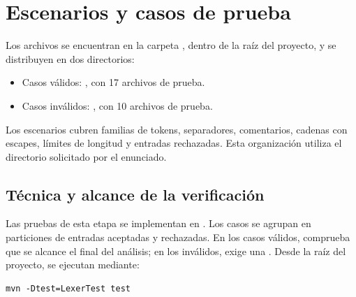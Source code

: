 \section{Escenarios y casos de prueba}
Los archivos se encuentran en la carpeta , dentro de
la raíz del proyecto, y se distribuyen en dos directorios:
\begin{itemize}[leftmargin=*]
  \item Casos válidos: , con 17 archivos de prueba.
  \item Casos inválidos: , con 10 archivos de prueba.
\end{itemize}
Los escenarios cubren familias de tokens, separadores, comentarios,
cadenas con escapes, límites de longitud y entradas rechazadas.
Esta organización utiliza el directorio  solicitado
por el enunciado.

\subsection{Técnica y alcance de la verificación}
Las pruebas de esta etapa se implementan en .
Los casos se agrupan en particiones
de entradas aceptadas y rechazadas. En los casos válidos,  comprueba que se
alcance el final del análisis; en los inválidos,  exige
una . Desde la raíz del proyecto, se ejecutan mediante:
\begin{verbatim}
mvn -Dtest=LexerTest test
\end{verbatim}

